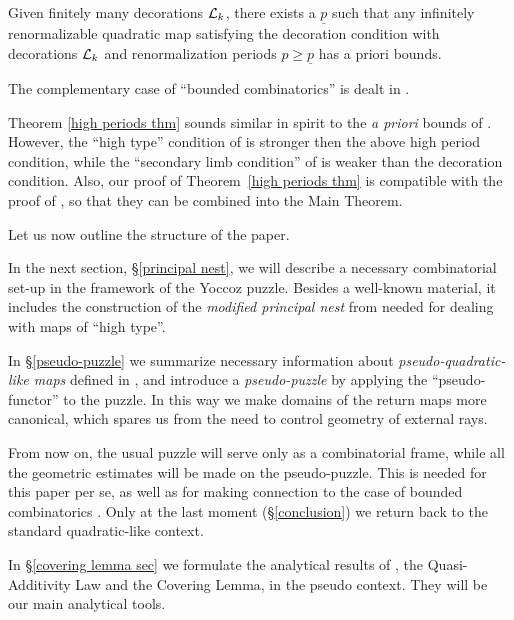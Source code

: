 \begin{thm}\label{high periods thm}
 Given finitely many decorations ${\mathcal L}_k$,
 there exists a $\underline p$ such that
any infinitely renormalizable quadratic map satisfying the decoration condition
with decorations ${\mathcal L}_k$ and renormalization periods $p\geq \underline p$ has
a priori bounds.
\end{thm}

The complementary case of ``bounded combinatorics'' is dealt in \cite{K}.


\begin{rem}
Theorem \ref{high periods thm} sounds similar in spirit to the {\it a priori} bounds
  of \cite{puzzle}. However, the   ``high type'' condition of \cite{puzzle} is stronger then the
  above high period condition, while the ``secondary limb condition'' of \cite{puzzle} is weaker than
the decoration condition. Also, our proof of Theorem~\ref{high periods thm} is compatible with the
  proof of \cite{K}, so that they can be combined into the Main Theorem.
\end{rem}



Let us now outline the structure of the paper.

In the next section, \S \ref{principal nest}, we will describe a necessary combinatorial
set-up in the framework of the Yoccoz puzzle. Besides a well-known material,
it includes the construction of the {\it modified principal nest} from \cite{KL-high}
needed for dealing with maps of ``high type''.


In \S \ref{pseudo-puzzle} we summarize necessary information about
{\it pseudo-quadratic-like maps} defined in \cite{K},
and introduce a {\it pseudo-puzzle} by applying the ``pseudo-functor'' to the puzzle.
In this way we make domains of the return maps more canonical,
which spares us from the need to control geometry of  external rays.

From now on, the usual puzzle will serve only as a combinatorial frame,
while all the geometric estimates will be made on the pseudo-puzzle.
This is needed for this paper per se, as well as for making connection to the
case of bounded combinatorics \cite{K}.
 Only at the last moment (\S \ref{conclusion})
we return back to the standard quadratic-like context.


In \S \ref{covering lemma sec} we formulate the analytical results of \cite{covering lemma},
the Quasi-Additivity Law and the Covering Lemma, in the pseudo context.
They will be our main analytical tools.

